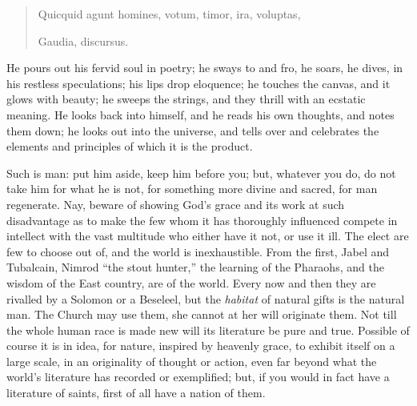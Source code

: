 \begin{quote}

Quicquid agunt homines, votum, timor, ira, voluptas,

Gaudia, discursus.

\end{quote}

He pours out his fervid soul in poetry; he sways to and fro, he
soars, he dives, in his restless speculations; his lips drop
eloquence; he touches the canvas, and it glows with beauty; he sweeps
the strings, and they thrill with an ecstatic meaning. He looks back
into himself, and he reads his own thoughts, and notes them down; he
looks out into the universe, and tells over and celebrates the
elements and principles of which it is the product.

Such is man: put him aside, keep him before you; but, whatever you
do, do not take him for what he is not, for something more divine and
sacred, for man regenerate. Nay, beware of showing God's grace and its
work at such disadvantage as to make the few whom it has thoroughly
influenced compete in intellect with the vast multitude who either
have it not, or use it ill. The elect are few to choose out of, and
the world is inexhaustible. From the first, Jabel and Tubalcain,
Nimrod ``the stout hunter,'' the learning of the Pharaohs, and
the wisdom of the East country, are of the world. Every now and then
they are rivalled by a Solomon or a Beseleel, but the \emph{habitat}
of natural gifts is the natural man. The Church may use them, she
cannot at her will originate them. Not till the whole human race
is made new will its literature be pure and true. Possible of course
it is in idea, for nature, inspired by heavenly grace, to exhibit
itself on a large scale, in an originality of thought or action, even
far beyond what the world's literature has recorded or exemplified;
but, if you would in fact have a literature of saints, first of all
have a nation of them.

